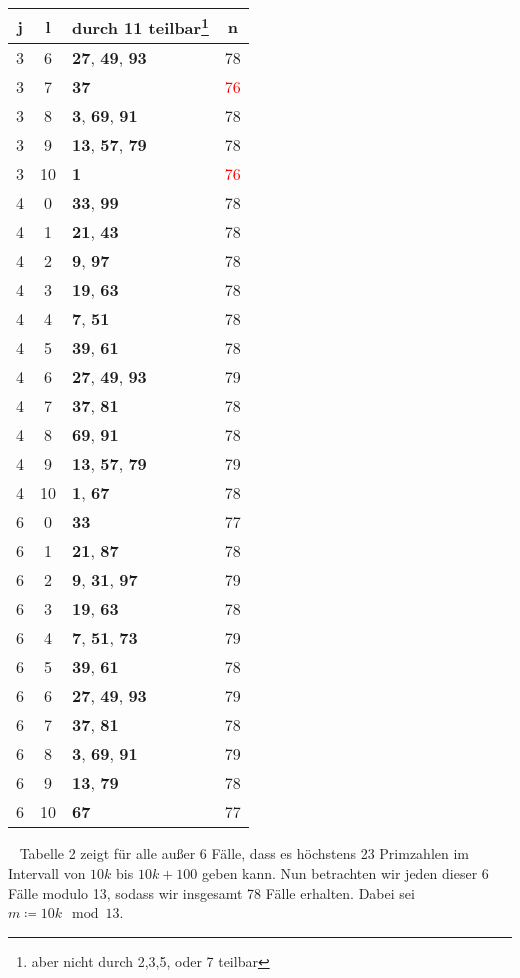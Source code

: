 \documentclass{article}
\begin{document}
\begin{minipage}[t]{0.5\textwidth}
\vspace{0pt}
\begin{tabular}{||c|c|l|c||}
	j&l&durch 11 teilbar\footnote{aber nicht durch 2,3,5, oder 7 teilbar}&n\\
	\hline
	3&6&\textbf{27}, \textbf{49}, \textbf{93}&78\\
	3&7&\textbf{37}&\textcolor{red}{76}\\
	3&8&\textbf{3}, \textbf{69}, \textbf{91}&78\\
	3&9&\textbf{13}, \textbf{57}, \textbf{79}&78\\
	3&10&\textbf{1}&\textcolor{red}{76}\\
	4&0&\textbf{33}, \textbf{99}&78\\
	4&1&\textbf{21}, \textbf{43}&78\\
	4&2&\textbf{9}, \textbf{97}&78\\
	4&3&\textbf{19}, \textbf{63}&78\\
	4&4&\textbf{7}, \textbf{51}&78\\
	4&5&\textbf{39}, \textbf{61}&78\\
	4&6&\textbf{27}, \textbf{49}, \textbf{93}&79\\
	4&7&\textbf{37}, \textbf{81}&78\\
	4&8&\textbf{69}, \textbf{91}&78\\
	4&9&\textbf{13}, \textbf{57}, \textbf{79}&79\\
	4&10&\textbf{1}, \textbf{67}&78\\
	6&0&\textbf{33}&77\\
	6&1&\textbf{21}, \textbf{87}&78\\
	6&2&\textbf{9}, \textbf{31}, \textbf{97}&79\\
	6&3&\textbf{19}, \textbf{63}&78\\
	6&4&\textbf{7}, \textbf{51}, \textbf{73}&79\\
	6&5&\textbf{39}, \textbf{61}&78\\
	6&6&\textbf{27}, \textbf{49}, \textbf{93}&79\\
	6&7&\textbf{37}, \textbf{81}&78\\
	6&8&\textbf{3}, \textbf{69}, \textbf{91}&79\\
	6&9&\textbf{13}, \textbf{79}&78\\
	6&10&\textbf{67}&77\\
\end{tabular}
\end{minipage}
\ \newline
Tabelle 2 zeigt für alle außer 6 Fälle, dass es höchstens 23 Primzahlen im Intervall von $10k$ bis $10k+100$ geben kann. Nun betrachten wir jeden dieser 6 Fälle modulo 13, sodass wir insgesamt 78 Fälle erhalten. Dabei sei $m\coloneqq 10k \mod 13$.\\
\end{document}
